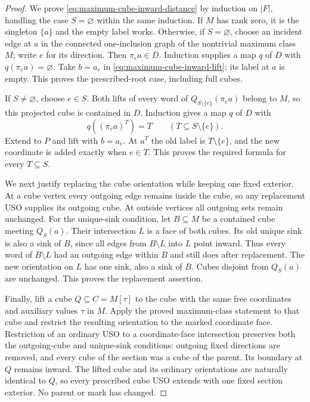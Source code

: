 \begin{proof}
We prove \eqref{eq:maximum-cube-inward-distance} by induction on $|F|$,
handling the case $S=\varnothing$ within the same induction. If $M$
has rank zero, it is the singleton $\{a\}$ and the empty label works.
Otherwise, if $S=\varnothing$, choose an incident edge at $a$ in the
connected one-inclusion graph of the nontrivial maximum class $M$;
write $e$ for its direction. Then $\pi_e a\in D$. Induction supplies
a map $q$ of $D$ with $q(\pi_e a)=\varnothing$. Take $b=a_e$ in
\eqref{eq:maximum-cube-inward-lift}; its label at $a$ is empty.
This proves the prescribed-root case, including full cubes.

If $S\ne\varnothing$, choose $e\in S$. Both lifts of every word of
$Q_{S\setminus\{e\}}(\pi_e a)$ belong to $M$, so this projected cube
is contained in $D$. Induction gives a map $q$ of $D$ with
\[
 q((\pi_e a)^T)=T\qquad(T\subseteq S\setminus\{e\}).
\]
Extend to $P$ and lift with $b=a_e$. At $a^T$ the old label is
$T\setminus\{e\}$, and the new coordinate is added exactly when
$e\in T$. This proves the required formula for every $T\subseteq S$.

We next justify replacing the cube orientation while keeping one fixed
exterior. At a cube vertex every outgoing edge remains inside the cube,
so any replacement USO supplies its outgoing cube. At outside vertices
all outgoing sets remain unchanged. For the unique-sink condition,
let $B\subseteq M$ be a contained cube meeting $Q_S(a)$. Their
intersection $L$ is a face of both cubes. Its old unique sink is also
a sink of $B$, since all edges from $B\setminus L$ into $L$ point
inward. Thus every word of $B\setminus L$ had an outgoing edge within
$B$ and still does after replacement. The new orientation on $L$ has
one sink, also a sink of $B$. Cubes disjoint from $Q_S(a)$ are
unchanged. This proves the replacement assertion.

Finally, lift a cube $Q\subseteq C=M[\tau]$ to the cube with the same
free coordinates and auxiliary values $\tau$ in $M$. Apply the proved
maximum-class statement to that cube and restrict the resulting
orientation to the marked coordinate face. Restriction of an ordinary
USO to a coordinate-face intersection preserves both the outgoing-cube
and unique-sink conditions: outgoing fixed directions are removed,
and every cube of the section was a cube of the parent. Its boundary
at $Q$ remains inward. The lifted cube and its ordinary orientations
are naturally identical to $Q$, so every prescribed cube USO extends
with one fixed section exterior. No parent or mark has changed.
\end{proof}

